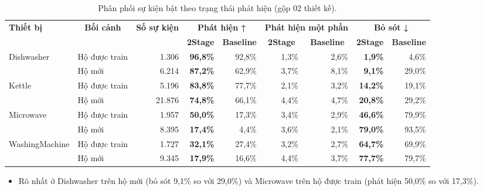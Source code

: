 \begin{table}[H]
\centering
\caption{Phân phối sự kiện bật theo trạng thái phát hiện (gộp 02 thiết kế).}\label{nilm:tab5}
\footnotesize
\setlength{\tabcolsep}{3.5pt}\renewcommand{\arraystretch}{1.12}
\begin{adjustbox}{max width=\linewidth}
\begin{tabular}{|l|l|r|r|r|r|r|r|r|}
\hline
\multirow{2}{*}{\textbf{Thiết bị}} & \multicolumn{1}{c|}{\multirow{2}{*}{\textbf{Bối cảnh}}} & \multicolumn{1}{c|}{\multirow{2}{*}{\textbf{Số sự kiện}}} & \multicolumn{2}{c|}{\textbf{Phát hiện ↑}} & \multicolumn{2}{c|}{\textbf{Phát hiện một phần}} & \multicolumn{2}{c|}{\textbf{Bỏ sót ↓}} \\ \cline{4-9}
 &  &  & \multicolumn{1}{c|}{\textbf{2Stage}} & \multicolumn{1}{c|}{\textbf{Baseline}} & \multicolumn{1}{c|}{\textbf{2Stage}} & \multicolumn{1}{c|}{\textbf{Baseline}} & \multicolumn{1}{c|}{\textbf{2Stage}} & \multicolumn{1}{c|}{\textbf{Baseline}} \\ \hline
\multirow{2}{*}{Dishwasher} & Hộ được train & 1.306 & \textbf{96,8\%} & 92,8\% & 1,3\% & 2,6\% & \textbf{1,9\%} & 4,6\% \\ \cline{2-9}
 & Hộ mới & 6.214 & \textbf{87,2\%} & 62,9\% & 3,7\% & 8,1\% & \textbf{9,1\%} & 29,0\% \\ \hline
\multirow{2}{*}{Kettle} & Hộ được train & 5.196 & \textbf{83,8\%} & 77,7\% & 2,1\% & 3,2\% & \textbf{14,2\%} & 19,1\% \\ \cline{2-9}
 & Hộ mới & 21.876 & \textbf{74,8\%} & 66,1\% & 4,4\% & 4,7\% & \textbf{20,8\%} & 29,2\% \\ \hline
\multirow{2}{*}{Microwave} & Hộ được train & 1.957 & \textbf{50,0\%} & 17,3\% & 3,4\% & 2,9\% & \textbf{46,6\%} & 79,9\% \\ \cline{2-9}
 & Hộ mới & 8.395 & \textbf{17,4\%} & 4,4\% & 3,6\% & 2,1\% & \textbf{79,0\%} & 93,5\% \\ \hline
\multirow{2}{*}{WashingMachine} & Hộ được train & 1.727 & \textbf{32,1\%} & 27,4\% & 3,2\% & 2,7\% & \textbf{64,7\%} & 69,9\% \\ \cline{2-9}
 & Hộ mới & 9.345 & \textbf{17,9\%} & 16,6\% & 4,4\% & 3,7\% & \textbf{77,7\%} & 79,7\% \\ \hline
\end{tabular}
\end{adjustbox}
\end{table}

\begin{itemize}
\item Rõ nhất ở Dishwasher trên hộ mới (bỏ sót 9,1\% so với 29,0\%) và Microwave trên hộ được train (phát hiện 50,0\% so với 17,3\%).
\end{itemize}

